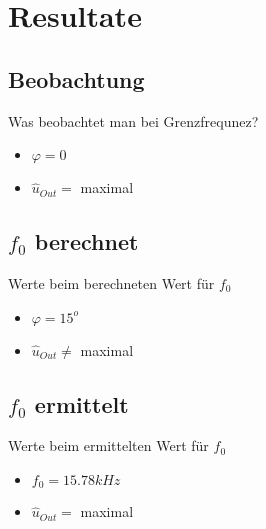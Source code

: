 \section{Resultate}

\subsection{Beobachtung}
\begin{frame}
	\begin{block}{Was beobachtet man bei Grenzfrequnez?}
		\begin{itemize}
			\item{$\varphi = 0$}
			\item{$\hat u_{Out} =$ maximal}
		\end{itemize}
	\end{block}
\end{frame}

\subsection{$f_0$ berechnet}
\begin{frame}
	\begin{block}{Werte beim berechneten Wert für $f_0$}
		\begin{itemize}
			\item $\varphi = 15^o$
			\item $\hat u_{Out} \neq$ maximal
		\end{itemize}
	\end{block}
\end{frame}

\subsection{$f_0$ ermittelt}
\begin{frame}
	\begin{block}{Werte beim ermittelten Wert für $f_0$}
		\begin{itemize}
			\item $f_0 = 15.78kHz$
			\item $\hat u_{Out} =$ maximal
		\end{itemize}
	\end{block}
\end{frame}
